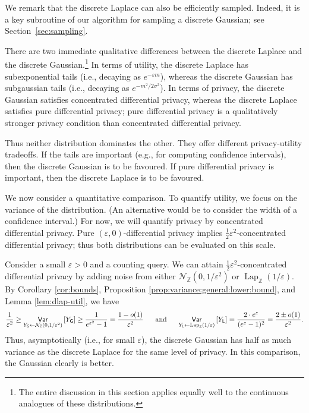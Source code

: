 \documentclass{jpcfinal} %
\newcommand{\discL}{\operatorname{Lap}_{\Z}} \newcommand{\discN}{\mathcal{N}_{\Z}}
\newcommand{\dgausss}[2]{{\discN\left(#1,#2\right)}}
\newcommand{\dgauss}[1]{\dgausss{0}{#1}}
\newcommand{\var}[2]{{\ifx&#1& \mathsf{Var} \else
\underset{#1}{\mathsf{Var}} \fi \left[#2\right]}}
\newcommand{\Z}{\mathbb{Z}}
\begin{document}
We remark that the discrete Laplace can also be efficiently sampled. Indeed, it is a key subroutine of our algorithm for sampling a discrete Gaussian; see Section~\ref{sec:sampling}.

There are two immediate qualitative differences between the discrete Laplace and the discrete Gaussian.\footnote{The entire discussion in this section applies equally well to the continuous analogues of these distributions.} In terms of utility, the discrete Laplace has subexponential tails (i.e., decaying as $e^{-\varepsilon m}$), whereas the discrete Gaussian has subgaussian tails (i.e., decaying as $e^{-m^2/2\sigma^2}$). In terms of privacy, the discrete Gaussian satisfies concentrated differential privacy, whereas the discrete Laplace satisfies pure differential privacy; pure differential privacy is a qualitatively stronger privacy condition than concentrated differential privacy.

Thus neither distribution dominates the other. They offer different privacy-utility tradeoffs. If the tails are important (e.g., for computing confidence intervals), then the discrete Gaussian is to be favoured. If pure differential privacy is important, then the discrete Laplace is to be favoured.

We now consider a quantitative comparison. To quantify utility, we focus on the variance of the distribution. (An alternative would be to consider the width of a confidence interval.) For now, we will quantify privacy by concentrated differential privacy. Pure $(\varepsilon,0)$-differential privacy implies $\frac12\varepsilon^2$-concentrated differential privacy; thus both distributions can be evaluated on this scale. 

Consider a small $\varepsilon>0$ and a counting query. We can attain $\frac12\varepsilon^2$-concentrated differential privacy by adding noise from either $\dgauss{1/\varepsilon^2}$ or $\discL(1/\varepsilon)$. By Corollary \ref{cor:bounds}, Proposition \ref{prop:variance:general:lower:bound}, and Lemma \ref{lem:dlap-util}, we have $$\frac{1}{\varepsilon^2} \ge \var{Y_\mathsf{G}\gets\dgauss{1/\varepsilon^2}}{Y_\mathsf{G}} \ge \frac{1}{e^{\varepsilon^2}-1} = \frac{1-o(1)}{\varepsilon^2} ~~~~\text{ and }~~~~ \var{Y_\mathsf{L}\gets\discL(1/\varepsilon)}{Y_\mathsf{L}} = \frac{2 \cdot e^\varepsilon}{(e^\varepsilon-1)^2}= \frac{2 \pm o(1)}{\varepsilon^2}.$$
Thus, asymptotically (i.e., for small $\varepsilon$), the discrete Gaussian has half as much variance as the discrete Laplace for the same level of privacy. In this comparison, the Gaussian clearly is better.
\end{document}
